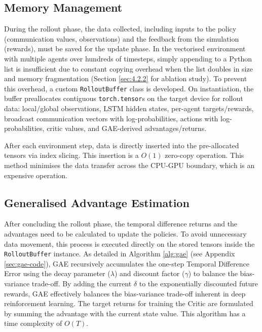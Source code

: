\subsection{Memory Management}
\label{sec:3.3.3}

During the rollout phase, the data collected, including inputs to the policy (communication values, observations) and the feedback from the simulation (rewards), must be saved for the update phase.
In the vectorised environment with multiple agents over hundreds of timesteps, simply appending to a Python list is insufficient due to constant copying overhead when the list doubles in size \cite{python_lists} and memory fragmentation \cite{python_memory_fragmentation} (Section \ref{sec:4.2.2} for ablation study).
To prevent this overhead, a custom \lstinline[language=Python]|RolloutBuffer| class is developed.
On instantiation, the buffer preallocates contiguous \lstinline[language=Python]|torch.tensor|s on the target device for rollout data: local/global observations, LSTM hidden states, per-agent targets/rewards, broadcast communication vectors with log-probabilities, actions with log-probabilities, critic values, and GAE-derived advantages/returns.

After each environment step, data is directly inserted into the pre-allocated tensors via index slicing.
This insertion is a $O(1)$ zero-copy operation.
This method minimises the data transfer across the CPU-GPU boundary, which is an expensive operation.

\subsection{Generalised Advantage Estimation}
\label{sec:3.3.4}

After concluding the rollout phase, the temporal difference returns and the advantages need to be calculated to update the policies.
To avoid unnecessary data movement, this process is executed directly on the stored tensors inside the \lstinline[language=Python]|RolloutBuffer| instance.
As detailed in Algorithm \ref{alg:gae} (see Appendix \ref{sec:gae-code}), GAE recursively accumulates the one-step Temporal Difference Error using the decay parameter ($\lambda$) and discount factor ($\gamma$) to balance the bias-variance trade-off.
By adding the current $\delta$ to the exponentially discounted future rewards, GAE effectively balances the bias-variance trade-off inherent in deep reinforcement learning.
The target returns for training the Critic are formulated by summing the advantage with the current state value.
This algorithm has a time complexity of $O(T)$.


